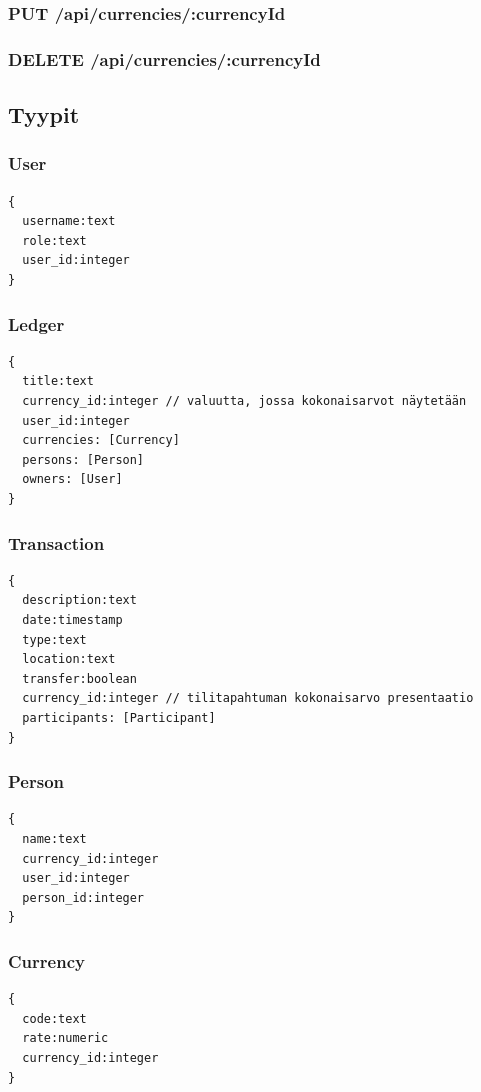 \documentclass[a4paper,parskip=half]{scrartcl}
\begin{document}
\subsubsection{PUT /api/currencies/:currencyId}

\subsubsection{DELETE /api/currencies/:currencyId}

\subsection{Tyypit}

\subsubsection{User}
\begin{Verbatim}
{
  username:text
  role:text
  user_id:integer
}
\end{Verbatim}

\subsubsection{Ledger}
\begin{Verbatim}
{
  title:text
  currency_id:integer // valuutta, jossa kokonaisarvot näytetään
  user_id:integer
  currencies: [Currency]
  persons: [Person]
  owners: [User]
}
\end{Verbatim}

\subsubsection{Transaction}
\begin{Verbatim}
{
  description:text
  date:timestamp
  type:text
  location:text
  transfer:boolean
  currency_id:integer // tilitapahtuman kokonaisarvo presentaatio
  participants: [Participant]
}
\end{Verbatim}

\subsubsection{Person}
\begin{Verbatim}
{
  name:text
  currency_id:integer
  user_id:integer
  person_id:integer
}
\end{Verbatim}

\subsubsection{Currency}
\begin{Verbatim}
{
  code:text
  rate:numeric
  currency_id:integer
}
\end{Verbatim}
\end{document}
